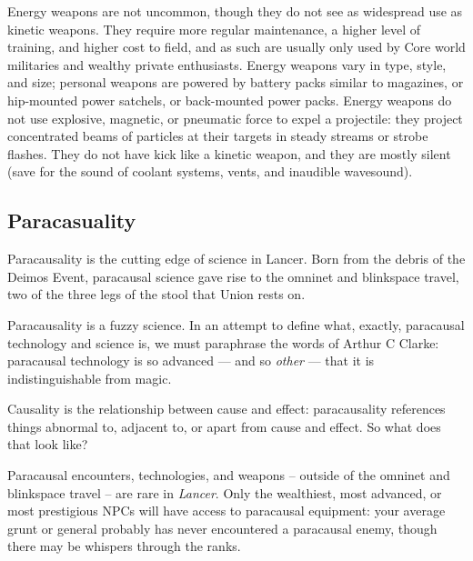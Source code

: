Energy weapons are not uncommon, though they do not see as widespread use as kinetic
weapons. They require more regular maintenance, a higher level of training, and higher cost to
field, and as such are usually only used by Core world militaries and wealthy private enthusiasts.
Energy weapons vary in type, style, and size; personal weapons are powered by battery packs
similar to magazines, or hip-mounted power satchels, or back-mounted power packs. Energy
weapons do not use explosive, magnetic, or pneumatic force to expel a projectile: they project
concentrated beams of particles at their targets in steady streams or strobe flashes. They do not
have kick like a kinetic weapon, and they are mostly silent (save for the sound of coolant
systems, vents, and inaudible wavesound).

\subsection{Paracasuality}

Paracausality is the cutting edge of science in Lancer. Born from the debris of the Deimos Event,
paracausal science gave rise to the omninet and blinkspace travel, two of the three legs of the
stool that Union rests on.

Paracausality is a fuzzy science. In an attempt to define what, exactly, paracausal technology
and science is, we must paraphrase the words of Arthur C Clarke: paracausal technology is so
advanced — and so \textit{other} — that it is indistinguishable from magic.

Causality is the relationship between cause and effect: paracausality references things abnormal
to, adjacent to, or apart from cause and effect. So what does that look like?

Paracausal encounters, technologies, and weapons -- outside of the omninet and blinkspace
travel -- are rare in \textit{Lancer}. Only the wealthiest, most advanced, or most prestigious NPCs will
have access to paracausal equipment: your average grunt or general probably has never
encountered a paracausal enemy, though there may be whispers through the ranks.